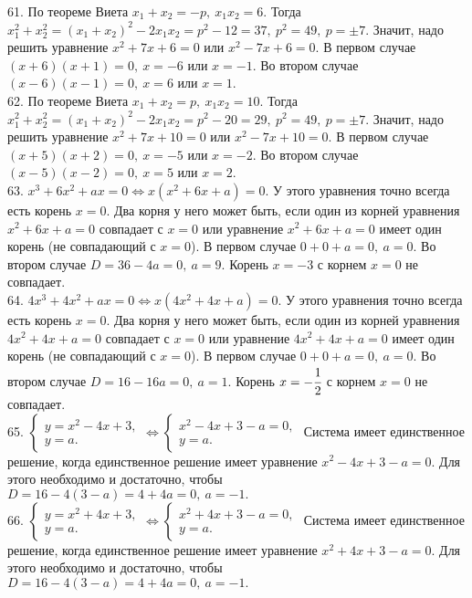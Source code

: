 61. По теореме Виета $x_1+x_2=-p,\ x_1x_2=6.$ Тогда $x_1^2+x_2^2=(x_1+x_2)^2-2x_1x_2=p^2-12=37,\ p^2=49,\ p=\pm7.$ Значит, надо решить уравнение $x^2+7x+6=0$ или  $x^2-7x+6=0.$ В первом случае $(x+6)(x+1)=0,\ x=-6$ или $x=-1.$ Во втором случае $(x-6)(x-1)=0,\ x=6$ или $x=1.$\\
62. По теореме Виета $x_1+x_2=p,\ x_1x_2=10.$ Тогда $x_1^2+x_2^2=(x_1+x_2)^2-2x_1x_2=p^2-20=29,\ p^2=49,\ p=\pm7.$ Значит, надо решить уравнение $x^2+7x+10=0$ или  $x^2-7x+10=0.$ В первом случае $(x+5)(x+2)=0,\ x=-5$ или $x=-2.$ Во втором случае $(x-5)(x-2)=0,\ x=5$ или $x=2.$\\
63. $x^3+6x^2+ax=0\Leftrightarrow x(x^2+6x+a)=0.$ У этого уравнения точно всегда есть корень $x=0.$ Два корня у него может быть, если один из корней уравнения
$x^2+6x+a=0$ совпадает с $x=0$ или уравнение $x^2+6x+a=0$ имеет один корень (не совпадающий с $x=0$). В первом случае $0+0+a=0,\ a=0.$ Во втором случае $D=36-4a=0,\ a=9.$ Корень $x=-3$ с корнем $x=0$ не совпадает.\\
64. $4x^3+4x^2+ax=0\Leftrightarrow x(4x^2+4x+a)=0.$ У этого уравнения точно всегда есть корень $x=0.$ Два корня у него может быть, если один из корней уравнения
$4x^2+4x+a=0$ совпадает с $x=0$ или уравнение $4x^2+4x+a=0$ имеет один корень (не совпадающий с $x=0$). В первом случае $0+0+a=0,\ a=0.$ Во втором случае $D=16-16a=0,\ a=1.$ Корень $x=-\cfrac{1}{2}$ с корнем $x=0$ не совпадает.\\
65. $\begin{cases} y=x^2-4x+3,\\ y=a.\end{cases}\Leftrightarrow
\begin{cases} x^2-4x+3-a=0,\\ y=a.\end{cases}$ Система имеет единственное решение, когда единственное решение имеет уравнение $x^2-4x+3-a=0.$ Для этого необходимо и достаточно, чтобы $D=16-4(3-a)=4+4a=0,\ a=-1.$\\
66. $\begin{cases} y=x^2+4x+3,\\ y=a.\end{cases}\Leftrightarrow
\begin{cases} x^2+4x+3-a=0,\\ y=a.\end{cases}$ Система имеет единственное решение, когда единственное решение имеет уравнение $x^2+4x+3-a=0.$ Для этого необходимо и достаточно, чтобы $D=16-4(3-a)=4+4a=0,\ a=-1.$\\
